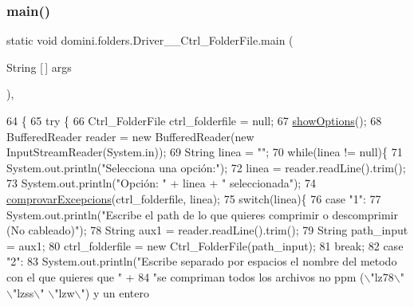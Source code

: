 \subsubsection{\texorpdfstring{main()}{main()}}
{\footnotesize\ttfamily static void domini.\+folders.\+Driver\+\_\+\+\_\+\+Ctrl\+\_\+\+Folder\+File.\+main (\begin{DoxyParamCaption}\item[{String \mbox{[}$\,$\mbox{]}}]{args }\end{DoxyParamCaption})\hspace{0.3cm}{\ttfamily [inline]}, {\ttfamily [static]}}


\begin{DoxyCode}
64                                            \{
65     \textcolor{keywordflow}{try} \{
66         Ctrl\_FolderFile ctrl\_folderfile = null;
67         \hyperlink{classdomini_1_1folders_1_1Driver____Ctrl__FolderFile_a5343134690950988d119d5e124edb1b4}{showOptions}();
68         BufferedReader reader = \textcolor{keyword}{new} BufferedReader(\textcolor{keyword}{new} InputStreamReader(System.in));
69         String linea = \textcolor{stringliteral}{""};
70         \textcolor{keywordflow}{while}(linea != null)\{
71             System.out.println(\textcolor{stringliteral}{"Selecciona una opción:"});
72             linea = reader.readLine().trim();
73             System.out.println(\textcolor{stringliteral}{"Opción: "} + linea + \textcolor{stringliteral}{" seleccionada"});
74             \hyperlink{classdomini_1_1folders_1_1Driver____Ctrl__FolderFile_add85c568af9cc21b5b4dc8c413b8d565}{comprovarExcepcions}(ctrl\_folderfile, linea);
75             \textcolor{keywordflow}{switch}(linea)\{
76                 \textcolor{keywordflow}{case} \textcolor{stringliteral}{"1"}:
77                     System.out.println(\textcolor{stringliteral}{"Escribe el path de lo que quieres comprimir o descomprimir (No
       cableado)"});
78                     String aux1 = reader.readLine().trim();
79                     String path\_input = aux1;
80                     ctrl\_folderfile = \textcolor{keyword}{new} Ctrl\_FolderFile(path\_input);
81                 \textcolor{keywordflow}{break};
82                 \textcolor{keywordflow}{case} \textcolor{stringliteral}{"2"}:
83                     System.out.println(\textcolor{stringliteral}{"Escribe separado por espacios el nombre del metodo con el que
       quieres que "} +
84                             \textcolor{stringliteral}{"se compriman todos los archivos no ppm (\(\backslash\)"lz78\(\backslash\)" \(\backslash\)"lzss\(\backslash\)" \(\backslash\)"lzw\(\backslash\)") y un entero
}
\end{DoxyCode}
